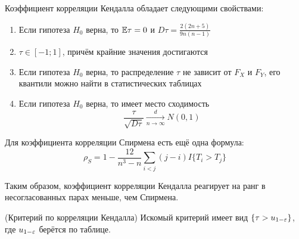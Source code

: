 \begin{proposition}
	Коэффициент корреляции Кендалла обладает следующими свойствами:
	\begin{enumerate}
		\item Если гипотеза $H_0$ верна, то $\mathbb{E} \tau = 0$ и $D \tau = \frac{2(2n + 5)}{9n(n - 1)}$
		
		\item $\tau \in [-1; 1]$, причём крайние значения достигаются
		
		\item Если гипотеза $H_0$ верна, то распределение $\tau$ не зависит от $F_X$ и $F_Y$, его квантили можно найти в статистических таблицах
		
		\item Если гипотеза $H_0$ верна, то имеет место сходимость
		\[
			\frac{\tau}{\sqrt{D \tau}} \xrightarrow[n \to \infty]{d} N(0, 1)
		\]
	\end{enumerate}
\end{proposition}

\begin{exercise}
	Для коэффициента корреляции Спирмена есть ещё одна формула:
	\[
		\rho_S = 1 - \frac{12}{n^3 - n}\sum_{i < j} (j - i)I\{T_i > T_j\}
	\]
\end{exercise}

\begin{note}
	Таким образом, коэффициент корреляции Кендалла реагирует на ранг в несогласованных парах меньше, чем Спирмена.
\end{note}

\begin{solution} (Критерий по корреляции Кендалла)
	Искомый критерий имеет вид $\{\tau > u_{1 - \varepsilon}\}$, где $u_{1 - \varepsilon}$ берётся по таблице.
\end{solution}